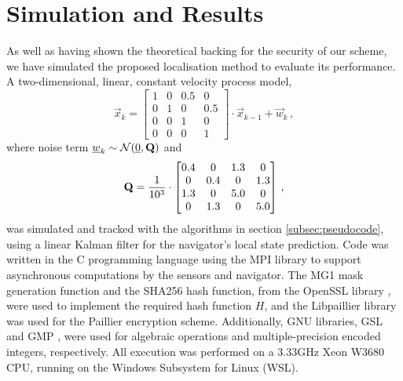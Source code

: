 \documentclass[10pt,letterpaper,oneside,twocolumn,journal]{IEEEtran}
\theoremstyle{definition}
\theoremstyle{definition}
\theoremstyle{remark}
\begin{document}
\section{Simulation and Results} \label{sec:sim_and_results}
As well as having shown the theoretical backing for the security of our scheme, we have simulated the proposed localisation method to evaluate its performance. A two-dimensional, linear, constant velocity process model,
\begin{equation*}
    \vec{x}_{k} = 
    \begin{bmatrix}
        1 & 0 & 0.5 & 0\\
        0 & 1 & 0 & 0.5\\
        0 & 0 & 1 & 0\\
        0 & 0 & 0 & 1
    \end{bmatrix} \cdot \vec{x}_{k-1} + \vec{w}_k\,,
\end{equation*}
where noise term ${\underline{w}}_k \sim \mathcal{N}({\underline{0}}, {{\mathbf{Q}}})$ and
\begin{equation*}
    {\ensuremath{{\mathbf{Q}}}} = \frac{1}{10^3} \cdot
    \begin{bmatrix}
        0.4 & 0 & 1.3 & 0\\
        0 & 0.4 & 0 & 1.3\\
        1.3 & 0 & 5.0 & 0\\
        0 & 1.3 & 0 & 5.0
    \end{bmatrix}\,,
\end{equation*}
was simulated and tracked with the algorithms in section \ref{subsec:pseudocode}, using a linear Kalman filter for the navigator's local state prediction. Code was written in the C programming language using the MPI library \cite{theopenmpiprojectOpenMPI2020} to support asynchronous computations by the sensors and navigator. The MG1 mask generation function and the SHA256 hash function, from the OpenSSL library \cite{theopensslprojectOpenSSL2020}, were used to implement the required hash function $H$, and the Libpaillier library \cite{bethencourtLibpaillier2010} was used for the Paillier encryption scheme. Additionally, GNU libraries, GSL \cite{thegsldevelopmentteamGSLGNUScientific2019} and GMP \cite{granlundGMPGNUMultiple2020}, were used for algebraic operations and multiple-precision encoded integers, respectively. All execution was performed on a 3.33GHz Xeon W3680 CPU, running on the Windows Subsystem for Linux (WSL).
\end{document}
